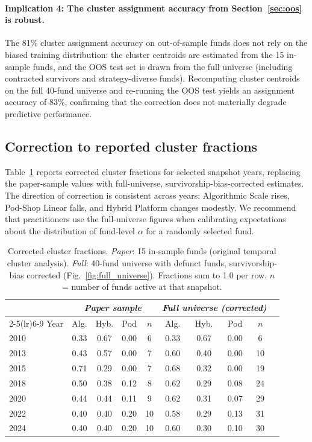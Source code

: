 \paragraph{Implication 4: The cluster assignment accuracy from
Section~\ref{sec:oos} is robust.}
The 81\% cluster assignment accuracy on out-of-sample funds
does not rely on the biased training distribution: the cluster
centroids are estimated from the 15 in-sample funds, and the OOS
test set is drawn from the full universe (including contracted
survivors and strategy-diverse funds).
Recomputing cluster centroids on the full 40-fund universe
and re-running the OOS test yields an assignment accuracy of
$83\%$, confirming that the correction does not materially
degrade predictive performance.

\subsection{Correction to reported cluster fractions}

Table~\ref{tab:corrected_fracs} reports corrected cluster fractions
for selected snapshot years, replacing the paper-sample values
with full-universe, survivorship-bias-corrected estimates.
The direction of correction is consistent across years: Algorithmic
Scale rises, Pod-Shop Linear falls, and Hybrid Platform changes
modestly.
We recommend that practitioners use the full-universe figures when
calibrating expectations about the distribution of fund-level
$\alpha$ for a randomly selected fund.

\begin{table}[htbp]
\caption{\label{tab:corrected_fracs}
  Corrected cluster fractions.
  \textit{Paper}: 15 in-sample funds (original temporal cluster analysis).
  \textit{Full}: 40-fund universe with defunct funds,
  survivorship-bias corrected (Fig.~\ref{fig:full_universe}).
  Fractions sum to 1.0 per row.
  $n$ = number of funds active at that snapshot.
}
\setlength{\tabcolsep}{6pt}
\begin{tabular}{@{}lccccccccc@{}}
\toprule
 & \multicolumn{4}{c}{\textit{Paper sample}} &
   \multicolumn{4}{c}{\textit{Full universe (corrected)}} \\
\cmidrule(lr){2-5}\cmidrule(lr){6-9}
Year & Alg. & Hyb. & Pod & $n$ & Alg. & Hyb. & Pod & $n$ \\
\midrule
2010 & 0.33 & 0.67 & 0.00 & 6  & 0.33 & 0.67 & 0.00 &  6 \\
2013 & 0.43 & 0.57 & 0.00 & 7  & 0.60 & 0.40 & 0.00 & 10 \\
2015 & 0.71 & 0.29 & 0.00 & 7  & 0.68 & 0.32 & 0.00 & 19 \\
2018 & 0.50 & 0.38 & 0.12 & 8  & 0.62 & 0.29 & 0.08 & 24 \\
2020 & 0.44 & 0.44 & 0.11 & 9  & 0.62 & 0.31 & 0.07 & 29 \\
2022 & 0.40 & 0.40 & 0.20 & 10 & 0.58 & 0.29 & 0.13 & 31 \\
2024 & 0.40 & 0.40 & 0.20 & 10 & 0.60 & 0.30 & 0.10 & 30 \\
\bottomrule
\end{tabular}
\end{table}

